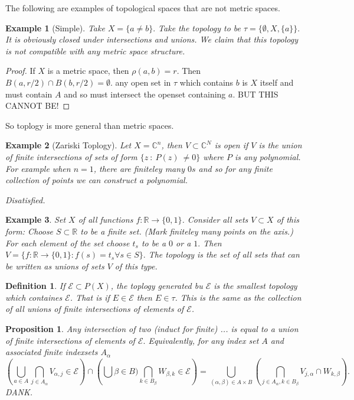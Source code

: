 \documentclass[letter]{article}
\newtheorem{example}{Example}
\newtheorem{definition}{Definition}
\newtheorem{proposition}{Proposition}
\def\scripte{{\mathcal E}}
\begin{document}
The following are examples of topological spaces that are not metric spaces.
\begin{example}[Simple]
	Take $X = \{a \neq b\}.$ Take the topology to be $\tau = \{\emptyset, X, \{a\}\}.$ It is obviously closed under intersections and unions. We claim that this topology is not \emph{compatible} with any metric space structure.
\end{example}
\begin{proof}
	If $X$ is a metric space, then $\rho(a,b) = r$. Then $B(a, r/2) \cap B(b, r/2) = \emptyset$. any open set in $\tau$ which contains $b$ is $X$ itself and must contain $A$ and so must intersect the openset containing $a$. BUT THIS CANNOT BE! 
\end{proof}
So toplogy is more general than metric spaces.
\begin{example}[Zariski Toplogy]
Let $X = \mathbb{C}^n$, then $V \subset \mathbb{C}^N$ is open if $V$ is the union of finite intersections of sets of form $\{z\ :\ P(z)\ \neq 0 \}$ where $P$ is any polynomial. For example when $n =1$, there are finiteley many $0s$ and so for any finite collection of points we can construct a polynomial.
\end{example}
\emph{Disatisfied.}
\begin{example}
	Set $X$ of all functions $f: \mathbb{R} \to \{0,1\}$. Consider all sets $V \subset X$ of this form:
	Choose $S \subset \mathbb{R}$ to be a finite set. (Mark finiteley many points on the axis.) For each element of the set
	choose $t_s$ to be a $0$ or a $1.$ Then $V =\{ f: \mathbb{R} \to \{0,1\}:f(s) = t_s \forall s \in S\}.$
	The topology is the set of all sets that can be written as unions of sets $V$ of this type.
\end{example}
\begin{definition}
	If $\scripte \subset P(X)$, the toplogy generated bu $\scripte$ is the smallest
	topology which containes $\scripte$. That is if $E \in \scripte$ then $E \in \tau$. This is the same
	as the collection of all unions of finite intersections of elements of $\scripte$.
\end{definition}
\begin{proposition}
	Any intersection of two (induct for finite) ... is equal to a union of finite intersections of elements of $\scripte.$ Equivalently, for any index set $A$ and associated finite indexsets $A_\alpha$
	\begin{equation*}
	\left(\bigcup_{a\in A} \bigcap_{j \in A_\alpha} V_{\alpha, j} \in \scripte\right) \cap \left( \bigcup{\beta \in B}) \bigcap_{k \in B_\beta} W_{\beta, k} \in \scripte\right) = \bigcup_{(\alpha, \beta) \in A \times B} \left(\bigcap_{j\in A_\alpha, k \in B_\beta} V_{j,\alpha} \cap W_{k, \beta}\right).
	\end{equation*}
	DANK.
\end{proposition}

\end{document}
